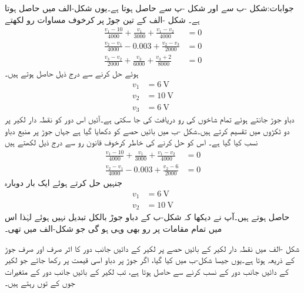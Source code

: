 جوابات:شکل -ب سے  اور شکل -پ سے  حاصل ہوتا ہے۔یوں شکل-الف میں  حاصل ہوتا ہے۔
شکل -الف  کے تین جوڑ پر کرخوف مساوات رو لکھتے
\begin{align*}
\frac{v_1-10}{4000}+\frac{v_1}{3000}+\frac{v_1-v_2}{4000}&=0\\
\frac{v_2-v_1}{4000}-0.003+\frac{v_2-v_3}{2000}&=0\\
\frac{v_3-v_2}{2000}+\frac{v_3}{6000}+\frac{v_3+2}{8000}&=0
\end{align*}
ہوئے حل کرنے سے درج ذیل حاصل ہوتے ہیں۔
\begin{align*}
v_1&=\SI{6}{\volt}\\
v_2&=\SI{10}{\volt}\\
v_3&=\SI{6}{\volt}
\end{align*}
دباو جوڑ جانتے ہوئے تمام شاخوں کی رو دریافت کی جا سکتی ہے۔آئیں اس دور کو نقطہ دار لکیر پر دو ٹکڑوں میں تقسیم کرتے ہیں۔شکل -ب میں بائیں حصے کو دکھایا گیا ہے جہاں جوڑ  پر  منبع دباو نسب کیا گیا ہے۔ اس کو حل کرنے کی خاطر کرخوف قانون رو سے درج ذیل لکھتے ہیں
\begin{align*}
\frac{v_1-10}{4000}+\frac{v_1}{3000}+\frac{v_1-v_2}{4000}&=0\\
\frac{v_2-v_1}{4000}-0.003+\frac{v_2-6}{2000}&=0
\end{align*}
جنہیں حل کرتے ہوئے ایک بار دوبارہ
\begin{align*}
v_1&=\SI{6}{\volt}\\
v_2&=\SI{10}{\volt}
\end{align*}
حاصل ہوتے ہیں۔آپ نے دیکھا کہ شکل-ب کے  دباو جوڑ بالکل تبدیل نہیں ہوئے لہٰذا اس میں تمام مقامات پر رو بھی وہی ہو گی جو شکل-الف میں تھی۔

شکل -الف میں نقطہ دار لکیر کے بائیں حصے پر لکیر کے دائیں جانب دور کا اثر صرف اور صرف جوڑ  کے ذریعہ ہوتا ہے۔یوں جیسا شکل-ب میں کیا گیا، اگر جوڑ  پر دباو اسی قیمت پر رکھا جائے جو لکیر کے دائیں جانب دور کے نسب کرنے سے حاصل ہوتا ہے، تب  لکیر کے بائیں جانب دور کے متغیرات جوں کے توں رہتے ہیں۔  

